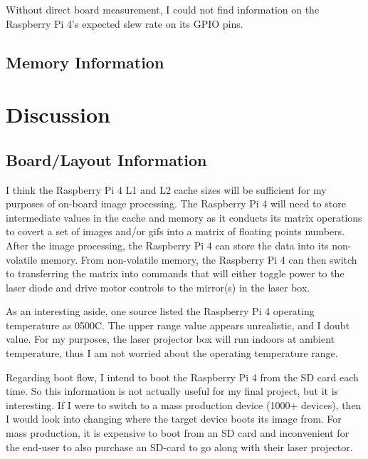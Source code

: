 \documentclass[journal]{IEEEtran}
\begin{document}
    Without direct board measurement, I could not find information on the Raspberry Pi 4's expected slew rate on its GPIO pins.

    \subsection{Memory Information}

    \section{Discussion}
    \subsection{Board/Layout Information}
    I think the Raspberry Pi 4 L1 and L2 cache sizes will be sufficient for my purposes of on-board image processing. 
    The Raspberry Pi 4 will need to store intermediate values in the cache and memory as it conducts its matrix operations to covert a set of images and/or gifs into a matrix of floating points numbers.
    After the image processing, the Raspberry Pi 4 can store the data into its non-volatile memory.
    From non-volatile memory, the Raspberry Pi 4 can then switch to transferring the matrix into commands that will either toggle power to the laser diode and drive motor controls to the mirror(s) in the laser box. 
    
    As an interesting aside, one source listed the Raspberry Pi 4 operating temperature as 0\-500C.
    The upper range value appears unrealistic, and I doubt value. 
    For my purposes, the laser projector box will run indoors at ambient temperature, thus I am not worried about the operating temperature range.

    Regarding boot flow, I intend to boot the Raspberry Pi 4 from the SD card each time. 
    So this information is not actually useful for my final project, but it is interesting.
    If I were to switch to a mass production device (1000+ devices), then I would look into changing where the target device boots its image from.
    For mass production, it is expensive to boot from an SD card and inconvenient for the end-user to also purchase an SD-card to go along with their laser projector.
    
\end{document}
